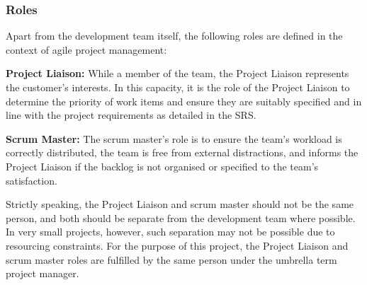 \documentclass[12pt]{article}
\begin{document}
\subsubsection{Roles}\label{procroles}
Apart from the development team itself, the following roles are defined in the context of agile project management:
\begin{description}
\item{\textbf{Project Liaison:}} While a member of the team, the Project Liaison represents the customer's interests. In this capacity, it is the role of the Project Liaison to determine the priority of work items and ensure they are suitably specified and in line with the project requirements as detailed in the SRS.
\item{\textbf{Scrum Master:}} The scrum master's role is to ensure the team's workload is correctly distributed, the team is free from external distractions, and informs the Project Liaison if the backlog is not organised or specified to the team's satisfaction.
\end{description}
Strictly speaking, the Project Liaison and scrum master should not be the same person, and both should be separate from the development team where possible. In very small projects, however, such separation may not be possible due to resourcing constraints. 
For the purpose of this project, the Project Liaison and scrum master roles are fulfilled by the same person under the umbrella term project manager.
\end{document}
